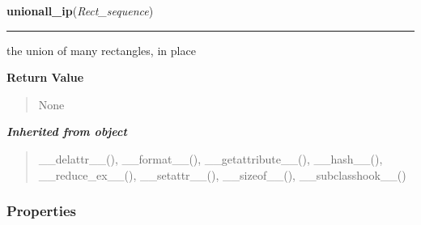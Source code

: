 \hspace{.8\funcindent}\begin{boxedminipage}{\funcwidth}

    \raggedright \textbf{unionall\_ip}(\textit{Rect\_sequence})

    \vspace{-1.5ex}

    \rule{\textwidth}{0.5\fboxrule}
\setlength{\parskip}{2ex}
    the union of many rectangles, in place

\setlength{\parskip}{1ex}
      \textbf{Return Value}
    \vspace{-1ex}

      \begin{quote}
      None

      \end{quote}

    \end{boxedminipage}


\large{\textbf{\textit{Inherited from object}}}

\begin{quote}
\_\_delattr\_\_(), \_\_format\_\_(), \_\_getattribute\_\_(), \_\_hash\_\_(), \_\_reduce\_ex\_\_(), \_\_setattr\_\_(), \_\_sizeof\_\_(), \_\_subclasshook\_\_()
\end{quote}


  \subsubsection{Properties}

